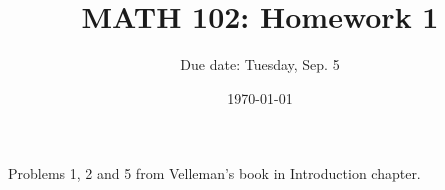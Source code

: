 \documentclass[12pt]{amsart}
\title{ MATH 102: Homework 1}
\author{Due date: Tuesday, Sep. 5}
\date{\today}
\begin{document}
\maketitle

Problems 1, 2 and 5 from Velleman's book in Introduction chapter.



\printbibliography 
%
%
\end{document}
